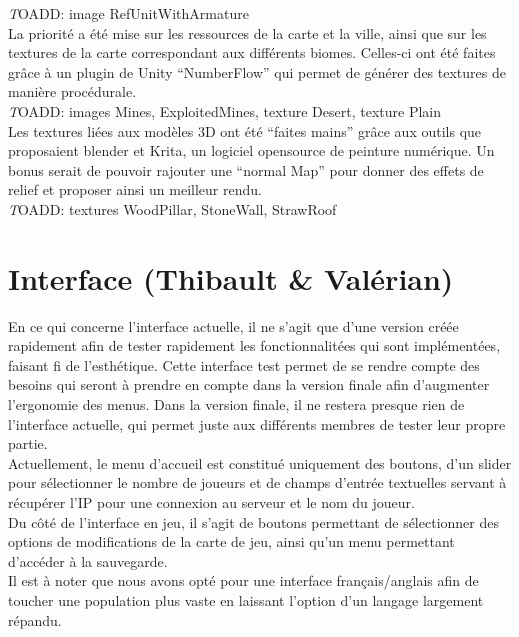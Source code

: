 \documentclass[12pt]{report}
\begin{document}
\textit TOADD: image RefUnitWithArmature\\

La priorité a été mise sur les ressources de la carte et la ville, ainsi que sur les textures de la carte correspondant aux différents biomes. Celles-ci ont été faites grâce à un plugin de Unity “NumberFlow” qui permet de générer des textures de manière procédurale.\\

\textit TOADD: images Mines, ExploitedMines, texture Desert, texture Plain\\

Les textures liées aux modèles 3D ont été “faites mains” grâce aux outils que proposaient blender et Krita, un logiciel opensource de peinture numérique. Un bonus serait de pouvoir rajouter une “normal Map” pour donner des effets de relief et proposer ainsi un meilleur rendu.\\

\textit TOADD: textures WoodPillar, StoneWall, StrawRoof


\newpage

\section{Interface (Thibault \& Valérian)}

En ce qui concerne l’interface actuelle, il ne s’agit que d’une version créée rapidement afin de tester rapidement les fonctionnalitées qui sont implémentées, faisant fi de l’esthétique. Cette interface test permet de se rendre compte des besoins qui seront à prendre en compte dans la version finale afin d’augmenter l'ergonomie des menus. Dans la version finale, il ne restera presque rien de l'interface actuelle, qui permet juste aux différents membres de tester leur propre partie.\\

Actuellement, le menu d’accueil est constitué uniquement des boutons, d’un slider pour sélectionner le nombre de joueurs et de champs d’entrée textuelles servant à récupérer l’IP pour une connexion au serveur et le nom du joueur.\\
Du côté de l’interface en jeu, il s’agit de boutons permettant de sélectionner des options de modifications de la carte de jeu, ainsi qu’un menu permettant d'accéder à la sauvegarde.\\
Il est à noter que nous avons opté pour une interface français/anglais afin de toucher une population plus vaste en laissant l'option d'un langage largement répandu.\\
\end{document}
